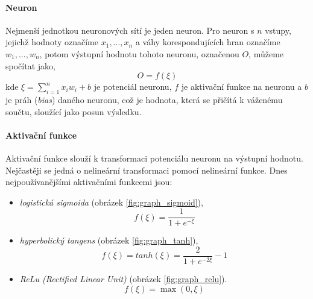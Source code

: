 \paragraph{Neuron}
Nejmenší jednotkou neuronových sítí je jeden neuron. Pro neuron s $n$ vstupy,
jejichž hodnoty označíme $x_1,...,x_n$ a váhy korespondujících hran označíme\\
$w_1,...,w_n$, potom výstupní hodnotu tohoto neuronu, označenou $O$,
můžeme spočítat jako,
\begin{equation}
    O = f(\xi)
\end{equation}
kde  $\xi = \sum_{i=1}^{n} x_iw_i + b$ je potenciál neuronu, $f$ je aktivační
funkce na neuronu a $b$ je práh (\emph{bias}) daného neuronu, což je hodnota,
která se přičítá k váženému součtu, sloužící jako posun výsledku.

\paragraph{Aktivační funkce}
Aktivační funkce slouží k transformaci potenciálu neuronu na výstupní hodnotu.
Nejčastěji se jedná o nelineární transformaci pomocí nelineární funkce. Dnes
nejpoužívanějšími aktivačními funkcemi jsou:

\begin{itemize}
    \item \emph{logistická sigmoida} (obrázek \ref{fig:graph_sigmoid}),
        \begin{equation}
            f(\xi) = \frac{1}{1+e^{-\xi}}
        \end{equation}
    \item \emph{hyperbolický tangens} (obrázek \ref{fig:graph_tanh}),
        \begin{equation}
            f(\xi) = tanh(\xi) = \frac{2}{1+e^{-2\xi}} - 1
        \end{equation}
    \item \emph{ReLu (Rectified Linear Unit)} (obrázek \ref{fig:graph_relu}).
        \begin{equation}
            f(\xi) = \max(0, \xi)
        \end{equation}
\end{itemize}

